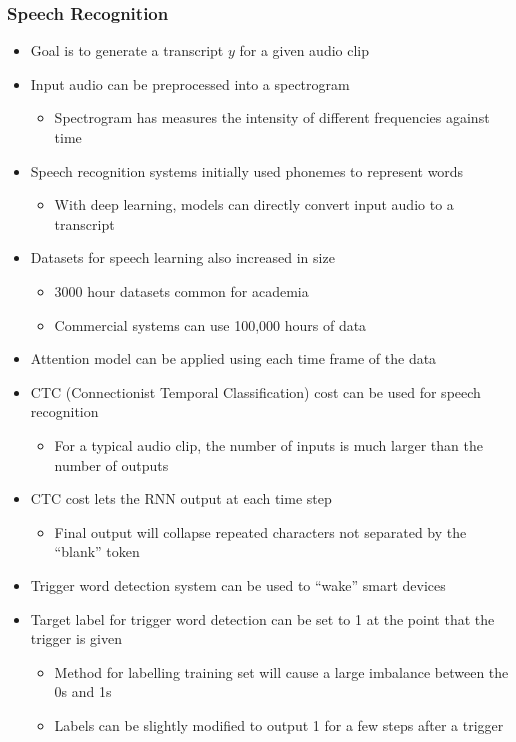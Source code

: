 \documentclass[12pt, letterpaper]{article}
\begin{document}
    \subsubsection{Speech Recognition}
    \begin{itemize}
        \item Goal is to generate a transcript $y$ for a given audio clip
        \item Input audio can be preprocessed into a spectrogram
        \begin{itemize}
            \item Spectrogram has measures the intensity of different frequencies against time
        \end{itemize}
        \item Speech recognition systems initially used phonemes to represent words
        \begin{itemize}
            \item With deep learning, models can directly convert input audio to a transcript
        \end{itemize}
        \item Datasets for speech learning also increased in size 
        \begin{itemize}
            \item 3000 hour datasets common for academia
            \item Commercial systems can use 100,000 hours of data
        \end{itemize}
        \item Attention model can be applied using each time frame of the data
        \item CTC (Connectionist Temporal Classification) cost can be used for speech recognition
        \begin{itemize}
            \item For a typical audio clip, the number of inputs is much larger than the number of outputs
        \end{itemize}
        \item CTC cost lets the RNN output at each time step
        \begin{itemize}
            \item Final output will collapse repeated characters not separated by the ``blank'' token
        \end{itemize}
        \item Trigger word detection system can be used to ``wake'' smart devices
        \item Target label for trigger word detection can be set to 1 at the point that the trigger is given 
        \begin{itemize}
            \item Method for labelling training set will cause a large imbalance between the 0s and 1s
            \item Labels can be slightly modified to output 1 for a few steps after a trigger
        \end{itemize}
    \end{itemize}
    
\end{document}

